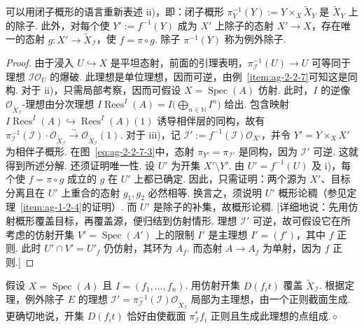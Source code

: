 可以用闭子概形的语言重新表述 ii)，即：闭子概形 $\pi_Y^{-1}(Y):=Y\times_X\widetilde X_Y$ 是 $\widetilde X_Y$ 上的除子. 此外，对每个使 $Y':=f^{-1}(Y)$ 成为 $X'$ 上除子的态射 $X'\longrightarrow X$，存在唯一的态射 $g:X'\longrightarrow\widetilde X_{\mathcal I}$，使 $f=\pi\circ g$.
除子 $\pi^{-1}(Y)$ 称为例外除子.
\begin{proof}
由于浸入 $U\hookrightarrow X$ 是平坦态射，前面的引理表明，$\pi_{\mathcal I}^{-1}(U)\longrightarrow U$ 可等同于理想 $\mathcal I\mathcal O_U$ 的爆破. 此理想是单位理想，因而可逆，由例~\ref{item:ag-2-2-7}可知这是同构.
对于 ii)，只需局部考察，因而可假设 $X=\operatorname{Spec}(A)$ 仿射. 此时，$I$ 的逆像 $\mathcal O_{\widetilde X_{\mathcal I}}$-理想由分次理想 $I\operatorname{Rees}^{I}(A)=I\bigl(\bigoplus_{n\in\mathbb N}I^n\bigr)$ 给出. 包含映射 $I\operatorname{Rees}^{I}(A)\hookrightarrow\operatorname{Rees}^{I}(A)(1)$ 诱导相伴层的同构，故有 $\pi_{\mathcal I}^{-1}(\mathcal I)\cdot\mathcal O_{\widetilde X_{\mathcal I}}\xrightarrow\sim\mathcal O_{\widetilde X_{\mathcal I}}(1)$.
对于 iii)，记 $\mathcal I':=f^{-1}(\mathcal I)\mathcal O_{X'}$，并令 $Y'=Y\times_XX'$ 为相伴子概形. 在图~\eqref{eq:ag-2-2-7-3}中，态射 $\pi_{Y'}=\pi_{\mathcal I'}$ 是同构，因为 $\mathcal I'$ 可逆. 这就得到所述分解. 还须证明唯一性. 设 $U'$ 为开集 $X'\setminus Y'$. 由 $U'=f^{-1}(U)$ 及 i)，每个使 $f=\pi\circ g$ 成立的 $g$ 在 $U'$ 上都已确定.
因此，只需证明：两个源为 $X'$、目标分离且在 $U'$ 上重合的态射 $g_1,g_2$ 必然相等. 换言之，须说明 $U'$ 概形论稠（参见定理~\ref{item:ag-1-2-4}的证明）. 而 $U'$ 是除子的补集，故概形论稠. [详细地说：先用仿射概形覆盖目标，再覆盖源，便归结到仿射情形. 理想 $\mathcal I'$ 可逆，故可假设它在所考虑的仿射开集 $V'=\operatorname{Spec}(A')$ 上的限制 $I'$ 是主理想 $I'=(f')$，其中 $f$ 正则. 此时 $U'\cap V'=U'_f$ 仍仿射，其环为 $A_f$. 而态射 $A\longrightarrow A_f$ 为单射，因为 $f$ 正则.]
\end{proof}
\begin{example}\label{item:ag-2-2-11}
假设 $X=\operatorname{Spec}(A)$ 且 $I=(f_1,\ldots,f_n)$. 用仿射开集 $D(f_it)$ 覆盖 $\widetilde X_{\mathcal I}$. 根据定理，例外除子 $E$ 的理想 $\mathcal I'=\pi_{\mathcal I}^{-1}(\mathcal I)\mathcal O_{\widetilde X_{\mathcal I}}$ 局部为主理想，由一个正则截面生成. 更确切地说，开集 $D(f_it)$ 恰好由使截面 $\pi_{\mathcal I}^*f_i$ 正则且生成此理想的点组成.\unskip\nobreak\hfill\ensuremath{\diamond}
\renewcommand{\envenddiamond}{}%
\end{example}
